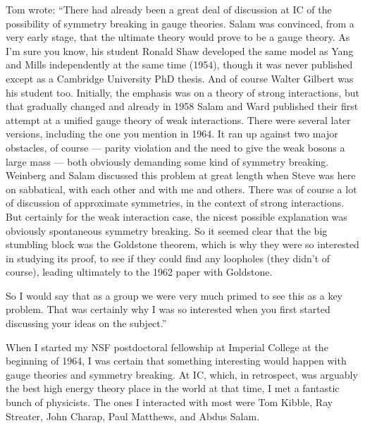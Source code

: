 \documentclass[12pt]{article}
\begin{document}
    Tom wrote: ``There had already been a great deal of discussion at IC of the
    possibility of symmetry breaking in gauge theories.  Salam was convinced,
    from a very early stage, that the ultimate theory would prove to be a
    gauge theory.  As I'm sure you know, his student Ronald Shaw developed the
    same model as Yang and Mills independently at the same time (1954), though
    it was never published except as a Cambridge University PhD thesis.  And
    of course Walter Gilbert was his student too.  Initially, the emphasis was
    on a theory of strong interactions, but that gradually changed and already
    in 1958 Salam and Ward published their first attempt at a unified gauge
    theory of weak interactions.  There were several later versions, including
    the one you mention in 1964.  It ran up against two major obstacles, of
    course --- parity violation and the need to give the weak bosons a large
    mass --- both obviously demanding some kind of symmetry breaking.  Weinberg
    and Salam discussed this problem at great length when Steve was here on
    sabbatical, with each other and with me and others.  There was of course a
    lot of discussion of approximate symmetries, in the context of strong
    interactions.  But certainly for the weak interaction case, the nicest
    possible explanation was obviously spontaneous symmetry breaking.  So it
    seemed clear that the big stumbling block was the Goldstone theorem, which
    is why they were so interested in studying its proof, to see if they could
    find any loopholes (they didn't of course), leading ultimately to the 1962
    paper with Goldstone.

    So I would say that as a group we were very much primed to see this as a
    key problem.  That was certainly why I was so interested when you first
    started discussing your ideas on the subject.'' 


   When I started my NSF postdoctoral fellowship at Imperial College
   at the beginning of 1964, I was certain that something
   interesting would happen with gauge theories and symmetry breaking. At
   IC, which, in retrospect, was arguably the best high energy theory
   place in the world at that time, I met a fantastic bunch of
   physicists. The ones I interacted with most were Tom Kibble,
   Ray Streater, John Charap, Paul Matthews, and Abdus Salam.
\end{document}
